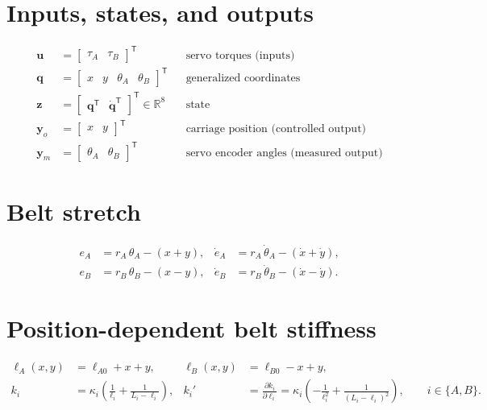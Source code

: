 \section*{Inputs, states, and outputs}
\begin{align}
\mathbf{u} &= \begin{bmatrix} \tau_A & \tau_B \end{bmatrix}^{\mathsf T}
  && \text{servo torques (inputs)} \\
\mathbf{q} &= \begin{bmatrix} x & y & \theta_A & \theta_B \end{bmatrix}^{\mathsf T}
  && \text{generalized coordinates} \\
\mathbf{z} &= \begin{bmatrix} \mathbf{q}^{\mathsf T} & \dot{\mathbf{q}}^{\mathsf T} \end{bmatrix}^{\mathsf T}
  \in \mathbb{R}^{8}
  && \text{state} \\
\mathbf{y}_o &= \begin{bmatrix} x & y \end{bmatrix}^{\mathsf T}
  && \text{carriage position (controlled output)} \\
\mathbf{y}_m &= \begin{bmatrix} \theta_A & \theta_B \end{bmatrix}^{\mathsf T}
  && \text{servo encoder angles (measured output)}
\end{align}

\section*{Belt stretch}
\begin{align}
e_A &= r_A\,\theta_A - (x + y), &
\dot{e}_A &= r_A\,\dot{\theta}_A - (\dot{x} + \dot{y}), \\
e_B &= r_B\,\theta_B - (x - y), &
\dot{e}_B &= r_B\,\dot{\theta}_B - (\dot{x} - \dot{y}).
\end{align}

\section*{Position-dependent belt stiffness}
\begin{align}
\ell_A(x,y) &= \ell_{A0} + x + y, &
\ell_B(x,y) &= \ell_{B0} - x + y, \\
k_i &= \kappa_i \left( \frac{1}{\ell_i} + \frac{1}{L_i - \ell_i} \right), &
k_i' &= \frac{\partial k_i}{\partial \ell_i}
      = \kappa_i \left( -\frac{1}{\ell_i^{2}} + \frac{1}{(L_i - \ell_i)^{2}} \right),
\qquad i \in \{A, B\}.
\end{align}

